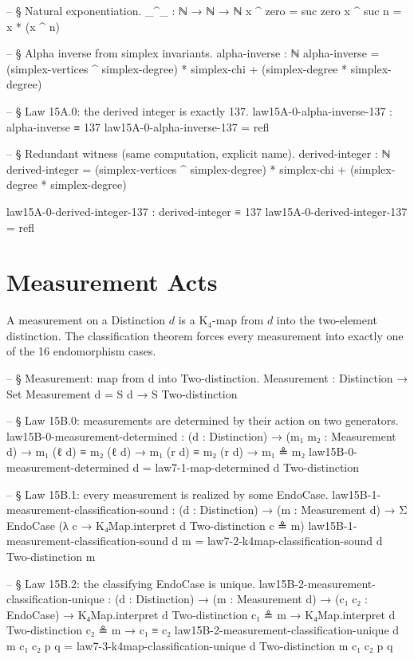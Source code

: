 \documentclass[11pt,a4paper]{book}
\begin{document}
\begin{code}
-- § Natural exponentiation.
_^_ : ℕ → ℕ → ℕ
x ^ zero = suc zero
x ^ suc n = x * (x ^ n)

-- § Alpha inverse from simplex invariants.
alpha-inverse : ℕ
alpha-inverse = (simplex-vertices ^ simplex-degree) * simplex-chi + (simplex-degree * simplex-degree)

-- § Law 15A.0: the derived integer is exactly 137.
law15A-0-alpha-inverse-137 : alpha-inverse ≡ 137
law15A-0-alpha-inverse-137 = refl

-- § Redundant witness (same computation, explicit name).
derived-integer : ℕ
derived-integer =
  (simplex-vertices ^ simplex-degree) * simplex-chi
  + (simplex-degree * simplex-degree)

law15A-0-derived-integer-137 : derived-integer ≡ 137
law15A-0-derived-integer-137 = refl
\end{code}

\section{Measurement Acts}

A measurement on a Distinction $d$ is a K$_4$-map from $d$ into the two-element
distinction. The classification theorem forces every measurement into exactly one of
the 16 endomorphism cases.

\begin{code}
-- § Measurement: map from d into Two-distinction.
Measurement : Distinction → Set
Measurement d = S d → S Two-distinction

-- § Law 15B.0: measurements are determined by their action on two generators.
law15B-0-measurement-determined :
  (d : Distinction) →
  (m₁ m₂ : Measurement d) →
  m₁ (ℓ d) ≡ m₂ (ℓ d) →
  m₁ (r d) ≡ m₂ (r d) →
  m₁ ≗ m₂
law15B-0-measurement-determined d =
  law7-1-map-determined d Two-distinction

-- § Law 15B.1: every measurement is realized by some EndoCase.
law15B-1-measurement-classification-sound :
  (d : Distinction) →
  (m : Measurement d) →
  Σ EndoCase (λ c → K₄Map.interpret d Two-distinction c ≗ m)
law15B-1-measurement-classification-sound d m =
  law7-2-k4map-classification-sound d Two-distinction m

-- § Law 15B.2: the classifying EndoCase is unique.
law15B-2-measurement-classification-unique :
  (d : Distinction) →
  (m : Measurement d) →
  (c₁ c₂ : EndoCase) →
  K₄Map.interpret d Two-distinction c₁ ≗ m →
  K₄Map.interpret d Two-distinction c₂ ≗ m →
  c₁ ≡ c₂
law15B-2-measurement-classification-unique d m c₁ c₂ p q =
  law7-3-k4map-classification-unique d Two-distinction m c₁ c₂ p q
\end{code}
\end{document}

